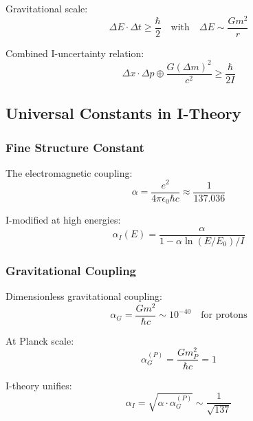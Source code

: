 Gravitational scale:
\begin{equation}
\label{eq:uncertainty_gravitational}
\Delta E \cdot \Delta t \geq \frac{\hbar}{2} \quad \text{with} \quad \Delta E \sim \frac{Gm^2}{r}
\end{equation}

Combined I-uncertainty relation:
\begin{equation}
\label{eq:i_uncertainty}
\Delta x \cdot \Delta p \oplus \frac{G(\Delta m)^2}{c^2} \geq \frac{\hbar}{2I}
\end{equation}

\subsection{Universal Constants in I-Theory}

\subsubsection{Fine Structure Constant}

The electromagnetic coupling:
\begin{equation}
\label{eq:fine_structure}
\alpha = \frac{e^2}{4\pi\epsilon_0\hbar c} \approx \frac{1}{137.036}
\end{equation}

I-modified at high energies:
\begin{equation}
\label{eq:i_fine_structure}
\alpha_I(E) = \frac{\alpha}{1 - \alpha \ln(E/E_0)/I}
\end{equation}

\subsubsection{Gravitational Coupling}

Dimensionless gravitational coupling:
\begin{equation}
\label{eq:gravitational_coupling}
\alpha_G = \frac{Gm^2}{\hbar c} \sim 10^{-40} \quad \text{for protons}
\end{equation}

At Planck scale:
\begin{equation}
\label{eq:planck_coupling}
\alpha_G^{(P)} = \frac{Gm_P^2}{\hbar c} = 1
\end{equation}

I-theory unifies:
\begin{equation}
\label{eq:unified_coupling}
\alpha_I = \sqrt{\alpha \cdot \alpha_G^{(P)}} \sim \frac{1}{\sqrt{137}}
\end{equation}

